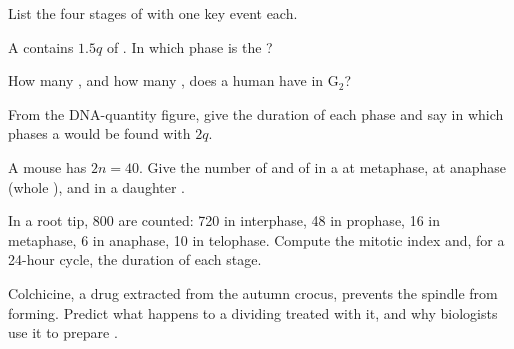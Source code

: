 \begin{exercise}[$\star$]\label{exo:g11:cell-cycle-mitosis:3}
List the four stages of  with one key event each.
\end{exercise}

\begin{exercise}[$\star$]\label{exo:g11:cell-cycle-mitosis:4}
A  contains $1.5q$ of . In which phase is the ?
\end{exercise}

\begin{exercise}[$\star$]\label{exo:g11:cell-cycle-mitosis:5}
How many , and how many , does a human  have
in $\mathrm{G_2}$?
\end{exercise}

\begin{exercise}[$\star\star$]\label{exo:g11:cell-cycle-mitosis:6}
From the DNA-quantity figure, give the duration of each phase and say
in which phases a  would be found with $2q$.
\end{exercise}

\begin{exercise}[$\star\star$]\label{exo:g11:cell-cycle-mitosis:7}
A mouse has $2n = 40$. Give the number of  and of 
in a  at metaphase, at anaphase (whole ), and in a daughter
.
\end{exercise}

\begin{exercise}[$\star\star$]\label{exo:g11:cell-cycle-mitosis:8}
In a root tip, 800  are counted: 720 in interphase, 48 in
prophase, 16 in metaphase, 6 in anaphase, 10 in telophase. Compute the
mitotic index and, for a 24-hour cycle, the duration of each stage.
\end{exercise}

\begin{exercise}[$\star\star$]\label{exo:g11:cell-cycle-mitosis:9}
Colchicine, a drug extracted from the autumn crocus, prevents the spindle from
forming. Predict what happens to a dividing  treated with it, and
why biologists use it to prepare .
\end{exercise}

